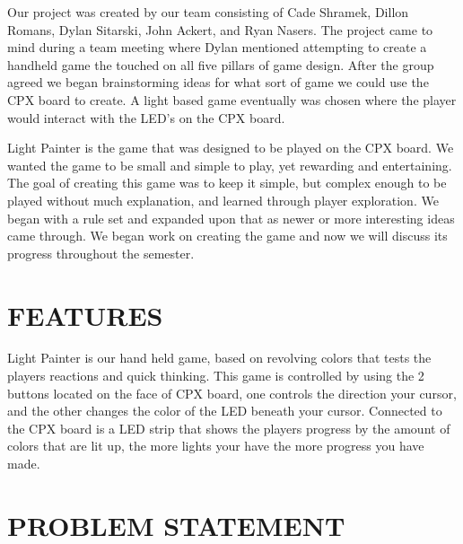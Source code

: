 \documentclass[12pt]{article}
\begin{document}
Our project was created by our team consisting of Cade Shramek, Dillon Romans, Dylan Sitarski, John Ackert, and Ryan Nasers. The project came to mind during a team meeting where Dylan mentioned attempting to create a handheld game the touched on all five pillars of game design. After the group agreed we began brainstorming ideas for what sort of game we could use the CPX board to create. A light based game eventually was chosen where the player would interact with the LED's on the CPX board. 

Light Painter is the game that was designed to be played on the CPX board. We wanted the game to be small and simple to play, yet rewarding and entertaining.\cite{designPrinciples} The goal of creating this game was to keep it simple, but complex enough to be played without much explanation, and learned through player exploration. We began with a rule set and expanded upon that as newer or more interesting ideas came through. We began work on creating the game and now we will discuss its progress throughout the semester. 

\section{FEATURES}

Light Painter is our hand held game, based on revolving colors that tests the players reactions and quick thinking. This game is controlled by using the 2 buttons located on the face of CPX board, one controls the direction your cursor, and the other changes the color of the LED beneath your cursor. Connected to the CPX board is a LED strip that shows the players progress by the amount of colors that are lit up, the more lights your have the more progress you have made.

 

\section{PROBLEM STATEMENT}
\end{document}

